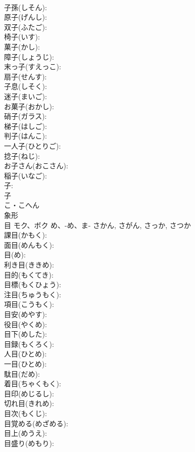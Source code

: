 \documentclass[8pt]{extreport}
\begin{document}
\begin{CJK}{UTF8}{min}
\\	子孫(しそん): 
\\	原子(げんし): 
\\	双子(ふたご): 
\\	椅子(いす): 
\\	菓子(かし): 
\\	障子(しょうじ): 
\\	末っ子(すえっこ): 
\\	扇子(せんす): 
\\	子息(しそく): 
\\	迷子(まいご): 
\\	お菓子(おかし): 
\\	硝子(ガラス): 
\\	梯子(はしご): 
\\	判子(はんこ): 
\\	一人子(ひとりご): 
\\	捻子(ねじ): 
\\	お子さん(おこさん): 
\\	稲子(いなご): 
\\	子: 
\\	子	
\\	こ・こへん	
\\	象形 
\\	目	モク、ボク	め、-め、ま-	さかん, さがん, さっか, さつか	
\\	課目(かもく): 
\\	面目(めんもく): 
\\	目(め): 
\\	利き目(ききめ): 
\\	目的(もくてき): 
\\	目標(もくひょう): 
\\	注目(ちゅうもく): 
\\	項目(こうもく): 
\\	目安(めやす): 
\\	役目(やくめ): 
\\	目下(めした): 
\\	目録(もくろく): 
\\	人目(ひとめ): 
\\	一目(ひとめ): 
\\	駄目(だめ): 
\\	着目(ちゃくもく): 
\\	目印(めじるし): 
\\	切れ目(きれめ): 
\\	目次(もくじ): 
\\	目覚める(めざめる): 
\\	目上(めうえ): 
\\	目盛り(めもり): 

\end{CJK}
\end{document}
